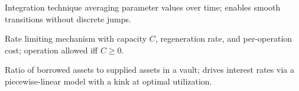 \documentclass[10pt,a4paper,twocolumn]{article}
\begin{document}
\begin{description}[style=nextline, font=\normalfont\bfseries, leftmargin=1.5em]
\item[Time-Weighted Mean] Integration technique averaging parameter values over time; enables smooth transitions without discrete jumps.

\item[Token Bucket] Rate limiting mechanism with capacity $C$, regeneration rate, and per-operation cost; operation allowed iff $C \geq 0$.

\item[Utilization] Ratio of borrowed assets to supplied assets in a vault; drives interest rates via a piecewise-linear model with a kink at optimal utilization.

\end{description}

\clearpage
\ifodd\value{page}\else\thispagestyle{empty}\null\clearpage\fi
\fi
\end{document}
